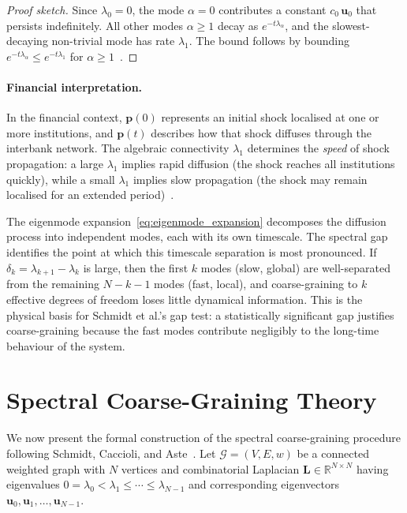 \begin{proof}[Proof sketch]
Since $\lambda_0 = 0$, the mode $\alpha = 0$ contributes a constant
$c_0\,\mathbf{u}_0$ that persists indefinitely.  All other modes
$\alpha \geq 1$ decay as $e^{-t\lambda_\alpha}$, and the slowest-decaying
non-trivial mode has rate $\lambda_1$.  The bound follows by bounding
$e^{-t\lambda_\alpha} \leq e^{-t\lambda_1}$ for $\alpha \geq
1$~\cite{chung1997spectral}.
\end{proof}

\paragraph{Financial interpretation.}
In the financial context, $\mathbf{p}(0)$ represents an initial shock
localised at one or more institutions, and $\mathbf{p}(t)$ describes how
that shock diffuses through the interbank network.  The algebraic
connectivity $\lambda_1$ determines the \emph{speed} of shock
propagation: a large $\lambda_1$ implies rapid diffusion (the shock
reaches all institutions quickly), while a small $\lambda_1$ implies
slow propagation (the shock may remain localised for an extended
period)~\cite{haldane2011systemic,elliott2014financial}.

The eigenmode expansion~\eqref{eq:eigenmode_expansion} decomposes the
diffusion process into independent modes, each with its own timescale.
The spectral gap identifies the point at which this timescale separation
is most pronounced.  If $\delta_k = \lambda_{k+1} - \lambda_k$ is
large, then the first $k$ modes (slow, global) are well-separated from
the remaining $N - k - 1$ modes (fast, local), and coarse-graining to
$k$ effective degrees of freedom loses little dynamical information.
This is the physical basis for Schmidt et al.'s gap test: a
statistically significant gap justifies coarse-graining because the
fast modes contribute negligibly to the long-time behaviour of the
system.


\section{Spectral Coarse-Graining Theory}
\label{sec:scg_theory}

We now present the formal construction of the spectral coarse-graining
procedure following Schmidt, Caccioli, and
Aste~\cite{schmidt2024spectral}.  Let $\mathcal{G} = (V, E, w)$ be a
connected weighted graph with $N$ vertices and combinatorial Laplacian
$\mathbf{L} \in \mathbb{R}^{N \times N}$ having eigenvalues $0 =
\lambda_0 < \lambda_1 \leq \cdots \leq \lambda_{N-1}$ and
corresponding eigenvectors $\mathbf{u}_0, \mathbf{u}_1, \ldots,
\mathbf{u}_{N-1}$.

